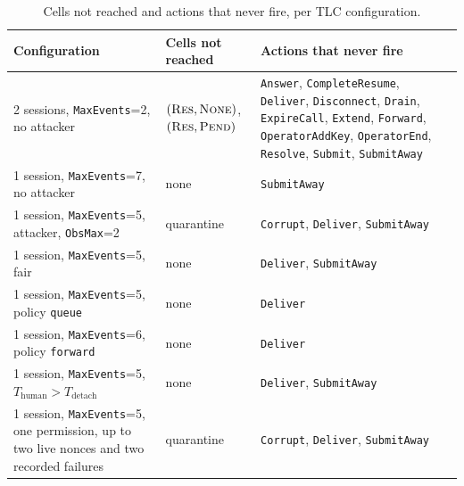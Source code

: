\begin{table}[htbp]
\centering
\caption{Cells not reached and actions that never fire, per TLC
configuration.}
\label{tab:tlc-reach}
\small
\begin{tabularx}{\columnwidth}{X l X}
\toprule
\textbf{Configuration} & \textbf{Cells not reached} & \textbf{Actions that never fire} \\
\midrule
2 sessions, \texttt{MaxEvents}=2, no attacker & $(\textsc{Res},\textsc{None})$,
$(\textsc{Res},\textsc{Pend})$ & \texttt{Answer}, \texttt{CompleteResume},
\texttt{Deliver}, \texttt{Disconnect}, \texttt{Drain},
\texttt{ExpireCall}, \texttt{Extend}, \texttt{Forward},
\texttt{OperatorAddKey}, \texttt{OperatorEnd}, \texttt{Resolve}, \texttt{Submit},
\texttt{SubmitAway} \\
1 session, \texttt{MaxEvents}=7, no attacker & none & \texttt{SubmitAway} \\
1 session, \texttt{MaxEvents}=5, attacker, \texttt{ObsMax}=2 & quarantine &
\texttt{Corrupt}, \texttt{Deliver}, \texttt{SubmitAway} \\
1 session, \texttt{MaxEvents}=5, fair & none & \texttt{Deliver},
\texttt{SubmitAway} \\
1 session, \texttt{MaxEvents}=5, policy \texttt{queue} & none &
\texttt{Deliver} \\
1 session, \texttt{MaxEvents}=6, policy \texttt{forward} & none &
\texttt{Deliver} \\
1 session, \texttt{MaxEvents}=5, $T_{\text{human}} > T_{\text{detach}}$ &
none & \texttt{Deliver}, \texttt{SubmitAway} \\
1 session, \texttt{MaxEvents}=5, one permission, up to two live nonces and two recorded failures &
quarantine & \texttt{Corrupt}, \texttt{Deliver}, \texttt{SubmitAway} \\
\bottomrule
\end{tabularx}
\end{table}

